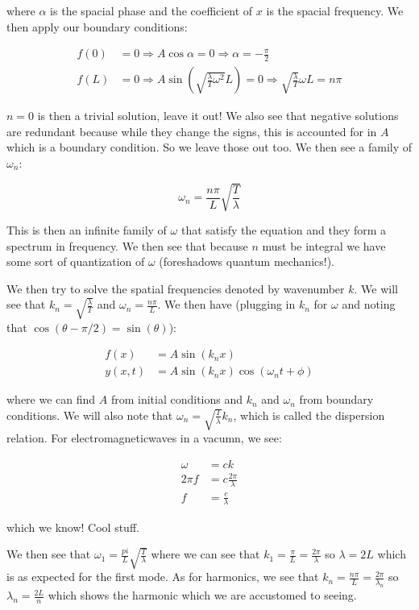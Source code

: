 \documentclass{report}
\begin{document}
where $\alpha$ is the spacial phase and the coefficient of $x$ is the spacial frequency. We then apply our boundary conditions:

\begin{align*}
f(0) &= 0 \Rightarrow A\cos\alpha = 0 \Rightarrow \alpha = -\frac{\pi}{2}\\
f(L) &= 0 \Rightarrow A\sin\left(\sqrt{\frac{\lambda}{T}\omega^2}L\right) = 0 \Rightarrow \sqrt{\frac{\lambda}{T}}\omega L = n\pi
\end{align*}

$n=0$ is then a trivial solution, leave it out! We also see that negative solutions are redundant because while they change the signs, this is accounted for in $A$ which is a boundary condition. So we leave those out too. We then see a family of $\omega_n$:

$$\omega_n = \frac{n\pi}{L}\sqrt{\frac{T}{\lambda}}$$

This is then an infinite family of $\omega$ that satisfy the equation and they form a spectrum in frequency. We then see that because $n$ must be integral we have some sort of quantization of $\omega$ (foreshadows quantum mechanics!).

We then try to solve the spatial frequencies denoted by wavenumber $k$. We will see that $k_n = \sqrt{\frac{\lambda}{T}}$ and $\omega_n = \frac{n\pi}{L}$. We then have (plugging in $k_n$ for $\omega$ and noting that $\cos(\theta - \pi/2) = \sin(\theta)$):

\begin{align*}
f(x) &= A\sin(k_nx)\\
y(x,t) &= A\sin(k_nx)\cos(\omega_nt + \phi)
\end{align*}

where we can find $A$ from initial conditions and $k_n$ and $\omega_n$ from boundary conditions. We will also note that $\omega_n = \sqrt{\frac{T}{\lambda}}k_n$, which is called the dispersion relation. For electromagneticwaves in a vacumn, we see:

\begin{align*}
\omega &= ck\\
2\pi f &= c \frac{2\pi}{\lambda}\\
f &= \frac{c}{\lambda}
\end{align*}

which we know! Cool stuff. 

We then see that $\omega_1 = \frac{pi}{L}\sqrt{\frac{T}{\lambda}}$ where we can see that $k_1 = \frac{\pi}{L} = \frac{2\pi}{\lambda}$ so $\lambda = 2L$ which is as expected for the first mode. As for harmonics, we see that $k_n = \frac{n\pi}{L} = \frac{2\pi}{\lambda_n}$ so $\lambda_n = \frac{2L}{n}$ which shows the harmonic which we are accustomed to seeing. 
\end{document}
